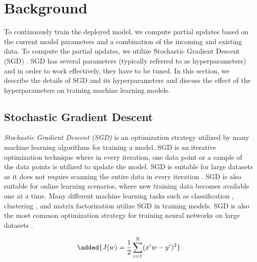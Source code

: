 \section{Background} \label{background}
To continuously train the deployed model, we compute partial updates based on the current model parameters and a combination of the incoming and existing data.
To compute the partial updates, we utilize Stochastic Gradient Descent (SGD) \cite{zhang2004solving}.
SGD has several parameters (typically referred to as hyperparameters) and in order to work effectively, they have to be tuned.
In this section, we describe the details of SGD and its hyperparameters and discuss the effect of the hyperparameters on training machine learning models.

\subsection{Stochastic Gradient Descent} \label{sgd}
\textit{Stochastic Gradient Descent (SGD)} is an optimization strategy utilized by many machine learning algorithms for training a model.
SGD is an iterative optimization technique where in every iteration, one data point or a sample of the data points is utilized to update the model.
SGD is suitable for large datasets as it does not require scanning the entire data in every iteration \cite{bottou2010large}.
SGD is also suitable for online learning scenarios, where new training data becomes available one at a time.
Many different machine learning tasks such as classification \cite{zhang2004solving, macmahan2013}, clustering \cite{bottou1995convergence}, and matrix factorization \cite{koren2009matrix,  funk2006netflix} utilize SGD in training models.
SGD is also the most common optimization strategy for training neural networks on large datasets \cite{dean2012large}.

\begin{equation}
\added{J(w)=\dfrac{1}{2}\sum_{i=1}^{N}(x^iw - y^i)^2}
\end{equation}

